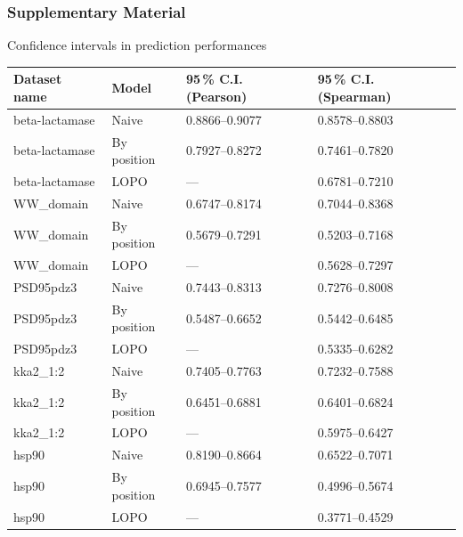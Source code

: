 \documentclass[10pt, british, luatex]{beamer}
\begin{document}
\begin{frame}
	\frametitle{Supplementary Material}
	Confidence intervals in prediction performances

	\tiny%
	\begin{tabular*}{\linewidth}{@{\extracolsep{\fill}}llll}%
		\toprule
		Dataset name            & Model       & \num{95}\,\% C.I. (Pearson) & \num{95}\,\% C.I. (Spearman) \\
		\midrule
		beta-lactamase & Naive       & \numrange{0.8866}{0.9077}        & \numrange{0.8578}{0.8803}         \\
		beta-lactamase & By position & \numrange{0.7927}{0.8272}        & \numrange{0.7461}{0.7820}         \\
		beta-lactamase & LOPO        & ---                              & \numrange{0.6781}{0.7210}         \\
		WW\_domain     & Naive       & \numrange{0.6747}{0.8174}        & \numrange{0.7044}{0.8368}         \\
		WW\_domain     & By position & \numrange{0.5679}{0.7291}        & \numrange{0.5203}{0.7168}         \\
		WW\_domain     & LOPO        & ---                              & \numrange{0.5628}{0.7297}         \\
		PSD95pdz3      & Naive       & \numrange{0.7443}{0.8313}        & \numrange{0.7276}{0.8008}         \\
		PSD95pdz3      & By position & \numrange{0.5487}{0.6652}        & \numrange{0.5442}{0.6485}         \\
		PSD95pdz3      & LOPO        & ---                              & \numrange{0.5335}{0.6282}         \\
		kka2\_1:2      & Naive       & \numrange{0.7405}{0.7763}        & \numrange{0.7232}{0.7588}         \\
		kka2\_1:2      & By position & \numrange{0.6451}{0.6881}        & \numrange{0.6401}{0.6824}         \\
		kka2\_1:2      & LOPO        & ---                              & \numrange{0.5975}{0.6427}         \\
		hsp90          & Naive       & \numrange{0.8190}{0.8664}        & \numrange{0.6522}{0.7071}         \\
		hsp90          & By position & \numrange{0.6945}{0.7577}        & \numrange{0.4996}{0.5674}         \\
		hsp90          & LOPO        & ---                              & \numrange{0.3771}{0.4529}         \\

\end{tabular*}
\end{frame}
\end{document}
